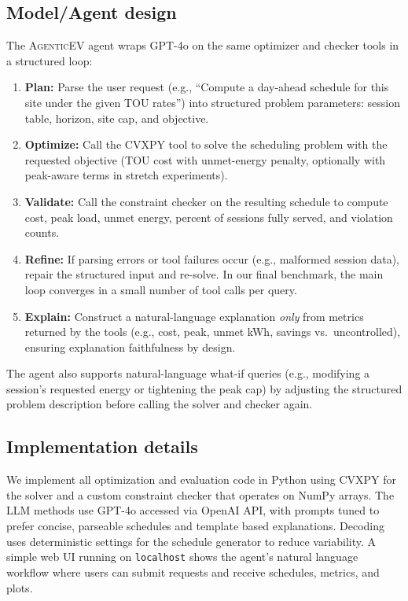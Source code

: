 \documentclass{article}
\newcommand{\modelname}{\textsc{AgenticEV}}
\begin{document}
\subsection{Model/Agent design}
The \modelname{} agent wraps GPT-4o on the same optimizer and checker tools in a structured loop:
\begin{enumerate}
  \item \textbf{Plan:} Parse the user request (e.g., ``Compute a day-ahead schedule for this site under the given TOU rates'') into structured problem parameters: session table, horizon, site cap, and objective.
  \item \textbf{Optimize:} Call the CVXPY tool to solve the scheduling problem with the requested objective (TOU cost with unmet-energy penalty, optionally with peak-aware terms in stretch experiments).
  \item \textbf{Validate:} Call the constraint checker on the resulting schedule to compute cost, peak load, unmet energy, percent of sessions fully served, and violation counts.
  \item \textbf{Refine:} If parsing errors or tool failures occur (e.g., malformed session data), repair the structured input and re-solve. In our final benchmark, the main loop converges in a small number of tool calls per query.
  \item \textbf{Explain:} Construct a natural-language explanation \emph{only} from metrics returned by the tools (e.g., cost, peak, unmet kWh, savings vs.\ uncontrolled), ensuring explanation faithfulness by design.
\end{enumerate}
The agent also supports natural-language what-if queries (e.g., modifying a session's requested energy or tightening the peak cap) by adjusting the structured problem description before calling the solver and checker again.

\subsection{Implementation details}
We implement all optimization and evaluation code in Python using CVXPY for the solver and a custom constraint checker that operates on NumPy arrays. The LLM methods use GPT-4o accessed via OpenAI API, with prompts tuned to prefer concise, parseable schedules and template based explanations. Decoding uses deterministic settings for the schedule generator to reduce variability. A simple web UI running on \texttt{localhost} shows the agent's natural language workflow where users can submit requests and receive schedules, metrics, and plots. 
\end{document}
